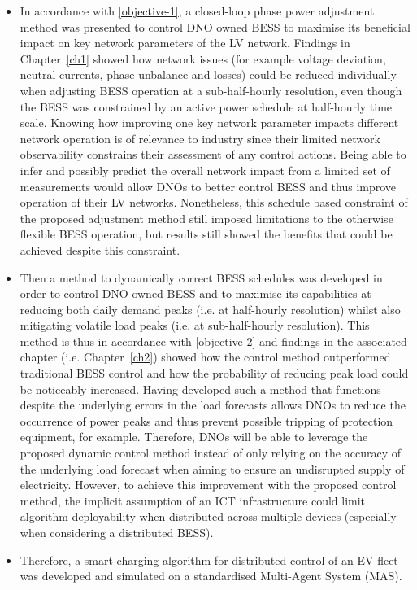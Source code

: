 \begin{itemize}
	\item
	In accordance with \ref{objective-1}, a closed-loop phase power adjustment method was presented to control DNO owned BESS to maximise its beneficial impact on key network parameters of the LV network.
	Findings in Chapter~\ref{ch1} showed how network issues (for example voltage deviation, neutral currents, phase unbalance and losses) could be reduced individually when adjusting BESS operation at a sub-half-hourly resolution, even though the BESS was constrained by an active power schedule at half-hourly time scale.
	Knowing how improving one key network parameter impacts different network operation is of relevance to industry since their limited network observability constrains their assessment of any control actions.
	Being able to infer and possibly predict the overall network impact from a limited set of measurements would allow DNOs to better control BESS and thus improve operation of their LV networks.
	Nonetheless, this schedule based constraint of the proposed adjustment method still imposed limitations to the otherwise flexible BESS operation, but results still showed the benefits that could be achieved despite this constraint.
	\item
	Then a method to dynamically correct BESS schedules was developed in order to control DNO owned BESS and to maximise its capabilities at reducing both daily demand peaks (i.e. at half-hourly resolution) whilst also mitigating volatile load peaks (i.e. at sub-half-hourly resolution).
	This method is thus in accordance with \ref{objective-2} and findings in the associated chapter (i.e. Chapter~\ref{ch2}) showed how the control method outperformed traditional BESS control and how the probability of reducing peak load could be noticeably increased.
	Having developed such a method that functions despite the underlying errors in the load forecasts allows DNOs to reduce the occurrence of power peaks and thus prevent possible tripping of protection equipment, for example.
	Therefore, DNOs will be able to leverage the proposed dynamic control method instead of only relying on the accuracy of the underlying load forecast when aiming to ensure an undisrupted supply of electricity.
	However, to achieve this improvement with the proposed control method, the implicit assumption of an ICT infrastructure could limit algorithm deployability when distributed across multiple devices (especially when considering a distributed BESS).
	\item
	Therefore, a smart-charging algorithm for distributed control of an EV fleet was developed and simulated on a standardised Multi-Agent System (MAS).

\end{itemize}
